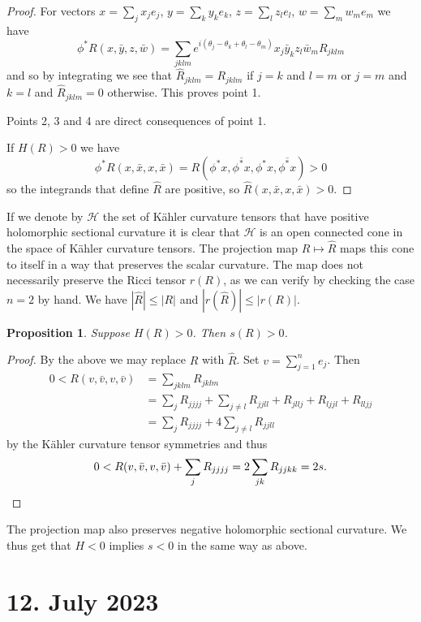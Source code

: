 \documentclass[11pt]{article}
\newtheorem{prop}[theo]{Proposition}
\theoremstyle{definition}
\newcommand{\cc}[1]{\mathcal{#1}}
\def\ov#1{\overline{#1}}
\begin{document}
\begin{proof}
For vectors $x=\sum_j x_j e_j$, $y = \sum_k y_k e_k$, $z = \sum_l z_l e_l$,
$w = \sum_m w_m e_m$ we have
$$
\phi^*R(x, \bar y, z, \bar w)
= \sum_{jklm} e^{i(\theta_j-\theta_k+\theta_l-\theta_m)}
x_j \bar y_k z_l \bar w_m R_{jklm}
$$
and so by integrating we see that
$\widehat R_{jklm} = R_{jklm}$ if $j=k$ and $l=m$ or $j=m$ and $k=l$ and
$\widehat R_{jklm} = 0$ otherwise.
This proves point 1.

Points 2, 3 and 4 are direct consequences of point 1.

If $H(R) > 0$ we have
$$
\phi^*R(x, \bar x, x, \bar x)
= R(\phi^* x, \ov{\phi^* x}, \phi^* x, \ov{\phi^* x}) > 0
$$
so the integrands that define $\widehat R$ are positive, so $\widehat R(x, \bar
x, x, \bar x) > 0$.
\end{proof}

If we denote by $\cc H$ the set of K\"ahler curvature tensors that have positive
holomorphic sectional curvature it is clear that $\cc H$ is an open connected
cone in the space of K\"ahler curvature tensors.
The projection map $R \mapsto \widehat R$ maps this cone to itself in a way
that preserves the scalar curvature.
The map does not necessarily preserve the Ricci tensor $r(R)$, as we can verify
by checking the case $n = 2$ by hand.
We have $|\widehat R| \leq |R|$ and $|r(\widehat R)| \leq |r(R)|$.


\begin{prop}
Suppose $H(R) > 0$. Then $s(R) > 0$.
\end{prop}

\begin{proof}
By the above we may replace $R$ with $\widehat R$.
Set $v = \sum_{j=1}^n e_j$. Then
\begin{align*}
0 < R(v, \bar v, v, \bar v)
&= \sum_{jklm} R_{jklm}
\\
&=
\sum_j R_{jjjj}
+ \sum_{j\not=l} R_{jjll} + R_{jllj} + R_{ljjl} + R_{lljj}
\\
&=
\sum_j R_{jjjj}
+ 4 \sum_{j\not=l} R_{jjll}
\end{align*}
by the K\"ahler curvature tensor symmetries
and thus
\[
0 < R(v, \bar v, v, \bar v) + \sum_j R_{jjjj}
= 2 \sum_{jk} R_{jjkk}
= 2s.
\qedhere
\]
\end{proof}

The projection map also preserves negative holomorphic sectional curvature.
We thus get that $H < 0$ implies $s < 0$ in the same way as above.


\section{12. July 2023}
\end{document}
